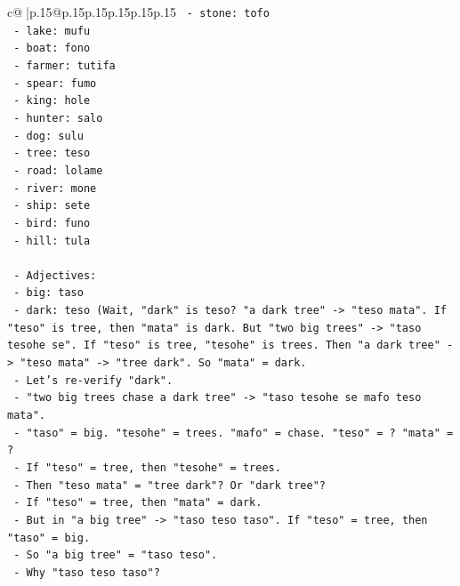 \documentclass{article}
\begin{document}
{\begin{supertabular}{c@{$\;$}|p{.15\linewidth}@{}p{.15\linewidth}p{.15\linewidth}p{.15\linewidth}p{.15\linewidth}p{.15\linewidth}}
{{{\texttt{          {-} stone: tofo} \\
\texttt{          {-} lake: mufu} \\
\texttt{          {-} boat: fono} \\
\texttt{          {-} farmer: tutifa} \\
\texttt{          {-} spear: fumo} \\
\texttt{          {-} king: hole} \\
\texttt{          {-} hunter: salo} \\
\texttt{          {-} dog: sulu} \\
\texttt{          {-} tree: teso} \\
\texttt{          {-} road: lolame} \\
\texttt{          {-} river: mone} \\
\texttt{          {-} ship: sete} \\
\texttt{          {-} bird: funo} \\
\texttt{          {-} hill: tula} \\
\\ 
\texttt{        {-} Adjectives:} \\
\texttt{          {-} big: taso} \\
\texttt{          {-} dark: teso (Wait, "dark" is teso? "a dark tree" {-}> "teso mata". If "teso" is tree, then "mata" is dark. But "two big trees" {-}> "taso tesohe se". If "teso" is tree, "tesohe" is trees. Then "a dark tree" {-}> "teso mata" {-}> "tree dark". So "mata" = dark.} \\
\texttt{          {-} Let's re{-}verify "dark".} \\
\texttt{          {-} "two big trees chase a dark tree" {-}> "taso tesohe se mafo teso mata".} \\
\texttt{          {-} "taso" = big. "tesohe" = trees. "mafo" = chase. "teso" = ? "mata" = ?} \\
\texttt{          {-} If "teso" = tree, then "tesohe" = trees.} \\
\texttt{          {-} Then "teso mata" = "tree dark"? Or "dark tree"?} \\
\texttt{          {-} If "teso" = tree, then "mata" = dark.} \\
\texttt{          {-} But in "a big tree" {-}> "taso teso taso". If "teso" = tree, then "taso" = big.} \\
\texttt{          {-} So "a big tree" = "taso teso".} \\
\texttt{          {-} Why "taso teso taso"?} \\
}}}
\end{supertabular}}
\end{document}
